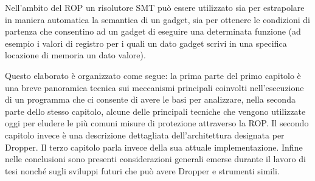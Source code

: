 Nell'ambito del ROP un risolutore SMT può essere utilizzato sia per
estrapolare in maniera automatica la semantica di un gadget, sia per
ottenere le condizioni di partenza che consentino ad un gadget di
eseguire una determinata funzione (ad esempio i valori di registro per
i quali un dato gadget scrivi in una specifica locazione di memoria un
dato valore).

Questo elaborato è organizzato come segue: la prima parte del primo
capitolo è una breve panoramica tecnica sui meccanismi principali
coinvolti nell'esecuzione di un programma che ci consente di avere le
basi per analizzare, nella seconda parte dello stesso capitolo, alcune
delle principali tecniche che vengono utilizzate oggi per eludere le
più comuni misure di protezione attraverso la ROP. Il secondo capitolo
invece è una descrizione dettagliata dell'architettura designata per
Dropper. Il terzo capitolo parla invece della sua attuale
implementazione. Infine nelle conclusioni sono presenti considerazioni
generali emerse durante il lavoro di tesi nonché sugli sviluppi futuri
che può avere Dropper e strumenti simili.




